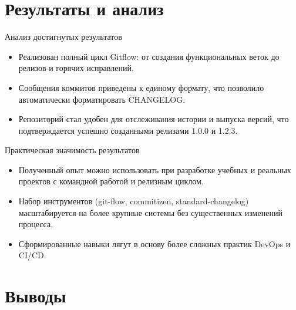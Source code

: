 \documentclass[
  ignorenonframetext,
  aspectratio=169,
  russian,
  aspectratio=169]{beamer}
\providecommand{\tightlist}{%
  \setlength{\itemsep}{0pt}\setlength{\parskip}{0pt}}
\begin{document}
\section{Результаты и
анализ}\label{ux440ux435ux437ux443ux43bux44cux442ux430ux442ux44b-ux438-ux430ux43dux430ux43bux438ux437}

\begin{frame}{Анализ достигнутых результатов}
\label{ux430ux43dux430ux43bux438ux437-ux434ux43eux441ux442ux438ux433ux43dux443ux442ux44bux445-ux440ux435ux437ux443ux43bux44cux442ux430ux442ux43eux432}
\begin{itemize}[<+->]
\tightlist
\item
  Реализован полный цикл Gitflow: от создания функциональных веток до
  релизов и горячих исправлений.
\item
  Сообщения коммитов приведены к единому формату, что позволило
  автоматически форматировать CHANGELOG.
\item
  Репозиторий стал удобен для отслеживания истории и выпуска версий, что
  подтверждается успешно созданными релизами 1.0.0 и 1.2.3.
\end{itemize}
\end{frame}

\begin{frame}{Практическая значимость результатов}
\label{ux43fux440ux430ux43aux442ux438ux447ux435ux441ux43aux430ux44f-ux437ux43dux430ux447ux438ux43cux43eux441ux442ux44c-ux440ux435ux437ux443ux43bux44cux442ux430ux442ux43eux432}
\begin{itemize}[<+->]
\tightlist
\item
  Полученный опыт можно использовать при разработке учебных и реальных
  проектов с командной работой и релизным циклом.
\item
  Набор инструментов (git-flow, commitizen, standard-changelog)
  масштабируется на более крупные системы без существенных изменений
  процесса.
\item
  Сформированные навыки лягут в основу более сложных практик DevOps и
  CI/CD.
\end{itemize}
\end{frame}

\section{Выводы}\label{ux432ux44bux432ux43eux434ux44b}
\end{document}
